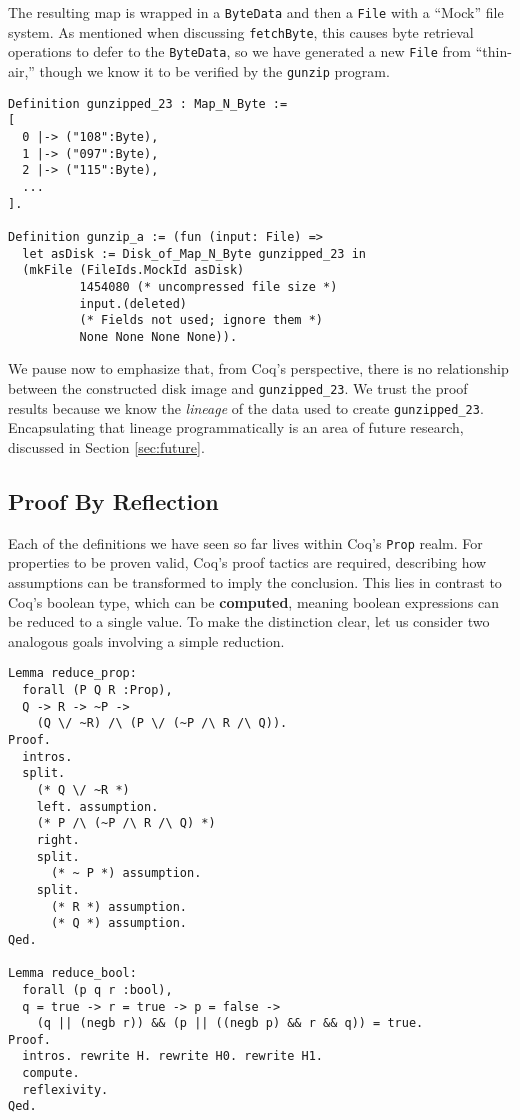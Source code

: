 \documentclass[nocopyrightspace,preprint]{sigplanconf}
\begin{document}
The resulting map is wrapped in a {\tt ByteData} and then a {\tt File} with a
``Mock'' file system. As mentioned when discussing {\tt fetchByte}, this
causes byte retrieval operations to defer to the {\tt ByteData}, so we have
generated a new {\tt File} from ``thin-air,'' though we know it to be verified
by the {\tt gunzip} program.

\begin{lstlisting}
Definition gunzipped_23 : Map_N_Byte := 
[ 
  0 |-> ("108":Byte), 
  1 |-> ("097":Byte), 
  2 |-> ("115":Byte), 
  ...
].

Definition gunzip_a := (fun (input: File) => 
  let asDisk := Disk_of_Map_N_Byte gunzipped_23 in
  (mkFile (FileIds.MockId asDisk)
          1454080 (* uncompressed file size *)
          input.(deleted) 
          (* Fields not used; ignore them *)
          None None None None)).
\end{lstlisting}

We pause now to emphasize that, from Coq's perspective, there is no
relationship between the constructed disk image and {\tt gunzipped\_23}. We
trust the proof results because we know the {\em lineage} of the data used to
create {\tt gunzipped\_23}. Encapsulating that lineage programmatically is an
area of future research, discussed in Section \ref{sec:future}.

\subsection{Proof By Reflection}
\label{subsec:reflection}

Each of the definitions we have seen so far lives within Coq's {\tt Prop}
realm. For properties to be proven valid, Coq's proof tactics are required,
describing how assumptions can be transformed to imply the conclusion. This
lies in contrast to Coq's boolean type, which can be {\bf computed}, meaning
boolean expressions can be reduced to a single value. To make the distinction
clear, let us consider two analogous goals involving a simple reduction.

\begin{lstlisting}
Lemma reduce_prop:
  forall (P Q R :Prop),
  Q -> R -> ~P ->
    (Q \/ ~R) /\ (P \/ (~P /\ R /\ Q)).
Proof.
  intros.
  split.
    (* Q \/ ~R *)
    left. assumption.
    (* P /\ (~P /\ R /\ Q) *)
    right. 
    split.
      (* ~ P *) assumption.
    split.
      (* R *) assumption.
      (* Q *) assumption.
Qed.

Lemma reduce_bool:
  forall (p q r :bool),
  q = true -> r = true -> p = false ->
    (q || (negb r)) && (p || ((negb p) && r && q)) = true.
Proof.
  intros. rewrite H. rewrite H0. rewrite H1.
  compute.
  reflexivity.
Qed.
\end{lstlisting}
\end{document}

